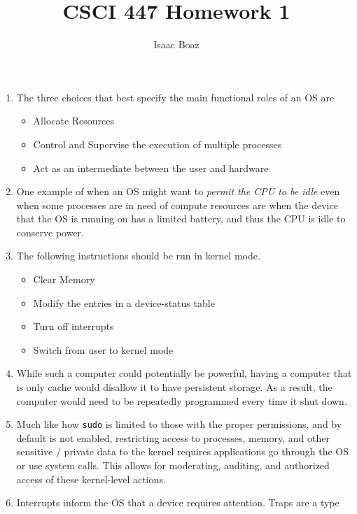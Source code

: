 \documentclass{article}
\title{\vspace{-1em}CSCI 447 Homework 1}
\author{Isaac Boaz}
\begin{document}
\maketitle

\begin{enumerate}
    \item The three choices that best specify the main functional roles of an OS are
          \begin{itemize}
              \item Allocate Resources
              \item Control and Supervise the execution of multiple processes
              \item Act as an intermediate between the user and hardware
          \end{itemize}
    \item One example of when an OS might want to \textit{permit the CPU to be
              idle} even when some processes are in need of compute resources are when the
          device that the OS is running on has a limited battery, and thus the CPU is
          idle to conserve power.
    \item The following instructions should be run in kernel mode.
          \begin{itemize}
              \item Clear Memory
              \item Modify the entries in a device-status table
              \item Turn off interrupts
              \item Switch from user to kernel mode
          \end{itemize}
    \item While such a computer could potentially be powerful, having a computer
          that is only cache would disallow it to have persistent storage. As a
          result, the computer would need to be repeatedly programmed every time it
          shut down.
    \item Much like how \texttt{sudo} is limited to those with the proper
          permissions, and by default is not enabled, restricting access to processes,
          memory, and other sensitive / private data to the kernel requires
          applications go through the OS or use system calls. This allows for
          moderating, auditing, and authorized access of these kernel-level actions.
    \item Interrupts inform the OS that a device requires attention. Traps are a type

\end{enumerate}
\end{document}
